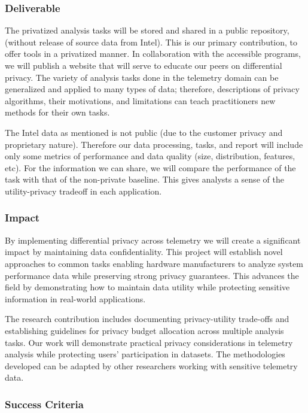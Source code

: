 \documentclass[12pt,letterpaper]{article}
\begin{document}
\subsubsection{Deliverable}

The privatized analysis tasks will be stored and shared in a public repository, (without release of source data from Intel). This is our primary contribution, to offer tools in a privatized manner. In collaboration with the accessible programs, we will publish a website that will serve to educate our peers on differential privacy. The variety of analysis tasks done in the telemetry domain can be generalized and applied to many types of data; therefore, descriptions of privacy algorithms, their motivations, and limitations can teach practitioners new methods for their own tasks. 

The Intel data as mentioned is not public (due to the customer privacy and proprietary nature). Therefore our data processing, tasks, and report will include only some metrics of performance and data quality (size, distribution, features, etc). For the information we can share, we will compare the performance of the task with that of the non-private baseline. This gives analysts a sense of the utility-privacy tradeoff in each application. 

\subsubsection{Impact}

By implementing differential privacy across telemetry we will create a significant impact by maintaining data confidentiality. This project will establish novel approaches to common tasks enabling hardware manufacturers to analyze system performance data while preserving strong privacy guarantees. This advances the field by demonstrating how to maintain data utility while protecting sensitive information in real-world applications. 

The research contribution includes documenting privacy-utility trade-offs and establishing guidelines for privacy budget allocation across multiple analysis tasks. Our work will demonstrate practical privacy considerations in telemetry analysis while protecting users’ participation in datasets. The methodologies developed can be adapted by other researchers working with sensitive telemetry data. 

\subsubsection{Success Criteria}
\end{document}
